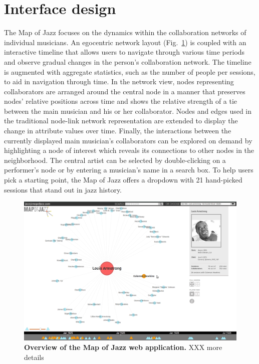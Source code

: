 \documentclass[12pt]{cmuthesis}
\begin{document}
\section{Interface design}


  The Map of Jazz focuses on the dynamics within the collaboration networks of individual musicians. An egocentric network layout (Fig.~\ref{fig:moj:overview}) is coupled with an interactive timeline that allows users to navigate through various time periods and observe gradual changes in the person's collaboration network. The timeline is augmented with aggregate statistics, such as the number of people per sessions, to aid in navigation through time. In the network view, nodes representing collaborators are arranged around the central node in a manner that preserves nodes' relative positions across time and shows the relative strength of a tie between the main musician and his or her collaborator. Nodes and edges used in the traditional node-link network representation are extended to display the change in attribute values over time. Finally, the interactions between the currently displayed main musician's collaborators can be explored on demand by highlighting a node of interest which reveals its connections to other nodes in the neighborhood. The central artist can be selected by double-clicking on a performer's node or by entering a musician's name in a search box. To help users pick a starting point, the Map of Jazz offers a dropdown with 21 hand-picked sessions that stand out in jazz history.


  \begin{figure}[tb!]
    \centering
    \includegraphics[width=\linewidth]{figures/moj_overview.png}
    \caption{\textbf{Overview of the Map of Jazz web application.} XXX more details}
    \label{fig:moj:overview}
  \end{figure}
\end{document}
